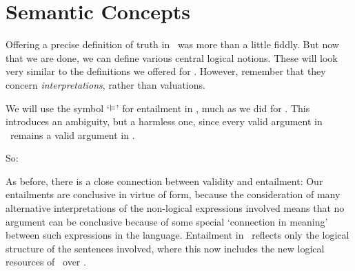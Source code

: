 \chapter{Semantic Concepts}\label{FOL.semantics}
Offering a precise definition of truth in \FOL\ was more than a little fiddly. But now that we are done, we can define various central logical notions. These will look very similar to the definitions we offered for \TFL. However, remember that they concern \emph{interpretations}, rather than valuations. 


We will use the symbol `$\vDash$' for entailment in \FOL, much as we did for \TFL. This introduces an ambiguity, but a harmless one, since every valid argument in \TFL\ remains a valid argument in \FOL.

So:

As before, there is a close connection between validity and entailment:  Our entailments are conclusive in virtue of form, because the consideration of many alternative interpretations of the non-logical expressions involved means that no argument can be conclusive because of some special `connection in meaning' between such expressions in the language. Entailment in \FOL\ reflects only the logical structure of the sentences involved, where this now includes the new logical resources of \FOL\ over \TFL.

